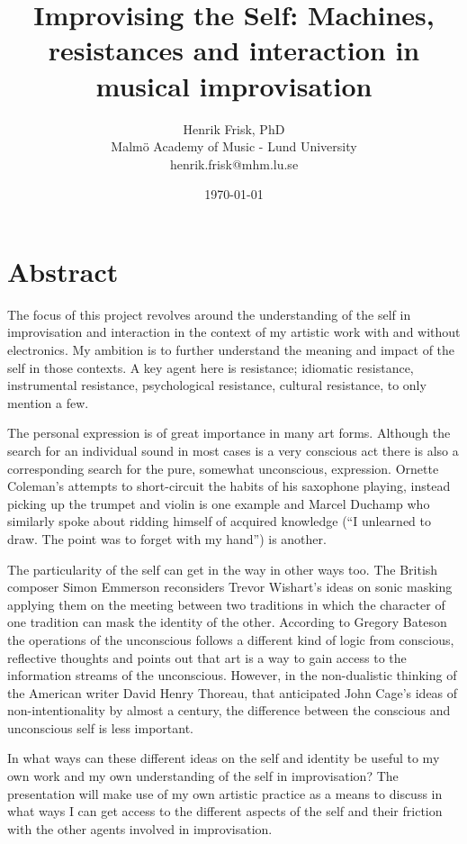 \documentclass[a4paper]{article}
\title{Improvising the Self: Machines, resistances and interaction in musical improvisation}
\author{Henrik Frisk, PhD\\{\small Malmö Academy of Music - Lund University}\\{\small henrik.frisk@mhm.lu.se}}
\date{\today}
\begin{document}
\maketitle

\thispagestyle{empty}

\section{Abstract}

The focus of this project revolves around the understanding of the self in improvisation and interaction in the context of my artistic work with and without electronics. My ambition is to further understand the meaning and impact of the self in those contexts. A key agent here is resistance; idiomatic resistance, instrumental resistance, psychological resistance, cultural resistance, to only mention a few.

The personal expression is of great importance in many art forms. Although the search for an individual sound in most cases is a very conscious act there is also a corresponding search for the pure, somewhat unconscious, expression.  Ornette Coleman's attempts to short-circuit the habits of his saxophone playing, instead picking up the trumpet and violin is one example and Marcel Duchamp who similarly spoke about ridding himself of acquired knowledge (``I unlearned to draw. The point was to forget with my hand'') is another.

The particularity of the self can get in the way in other ways too. The British composer Simon Emmerson reconsiders Trevor Wishart's ideas on sonic masking applying them on the meeting between two traditions in which the character of one tradition can mask the identity of the other. According to Gregory Bateson the operations of the unconscious follows a different kind of logic from conscious, reflective thoughts and points out that art is a way to gain access to the information streams of the unconscious. However, in the non-dualistic thinking of the American writer David Henry Thoreau, that anticipated John Cage's ideas of non-intentionality by almost a century, the difference between the conscious and unconscious self is less important. 

In what ways can these different ideas on the self and identity be useful to my own work and my own understanding of the self in improvisation? The presentation will make use of my own artistic practice as a means to discuss in what ways I can get access to the different aspects of the self and their friction with the other agents involved in improvisation.
\end{document}
